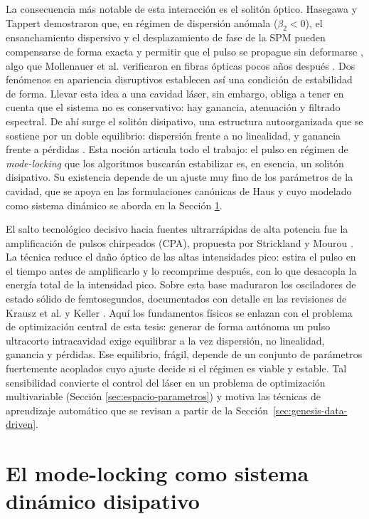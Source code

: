 La consecuencia más notable de esta interacción es el solitón óptico. Hasegawa y Tappert demostraron que, en régimen de dispersión anómala ($\beta_2 < 0$), el ensanchamiento dispersivo y el desplazamiento de fase de la SPM pueden compensarse de forma exacta y permitir que el pulso se propague sin deformarse \cite{HasegawaTappert1973}, algo que Mollenauer et al. verificaron en fibras ópticas pocos años después \cite{Mollenauer1980}. Dos fenómenos en apariencia disruptivos establecen así una condición de estabilidad de forma. Llevar esta idea a una cavidad láser, sin embargo, obliga a tener en cuenta que el sistema no es conservativo: hay ganancia, atenuación y filtrado espectral. De ahí surge el solitón disipativo, una estructura autoorganizada que se sostiene por un doble equilibrio: dispersión frente a no linealidad, y ganancia frente a pérdidas \cite{GreluAkhmediev2012}. Esta noción articula todo el trabajo: el pulso en régimen de \emph{mode-locking} que los algoritmos buscarán estabilizar es, en esencia, un solitón disipativo. Su existencia depende de un ajuste muy fino de los parámetros de la cavidad, que se apoya en las formulaciones canónicas de Haus \cite{Haus2000} y cuyo modelado como sistema dinámico se aborda en la Sección \ref{sec:mode-locking}.

El salto tecnológico decisivo hacia fuentes ultrarrápidas de alta potencia fue la amplificación de pulsos chirpeados (CPA), propuesta por Strickland y Mourou \cite{StricklandMourou1985}. La técnica reduce el daño óptico de las altas intensidades pico: estira el pulso en el tiempo antes de amplificarlo y lo recomprime después, con lo que desacopla la energía total de la intensidad pico. Sobre esta base maduraron los osciladores de estado sólido de femtosegundos, documentados con detalle en las revisiones de Krausz et al. \cite{Krausz1992} y Keller \cite{Keller2022, Keller2003}. Aquí los fundamentos físicos se enlazan con el problema de optimización central de esta tesis: generar de forma autónoma un pulso ultracorto intracavidad exige equilibrar a la vez dispersión, no linealidad, ganancia y pérdidas. Ese equilibrio, frágil, depende de un conjunto de parámetros fuertemente acoplados cuyo ajuste decide si el régimen es viable y estable. Tal sensibilidad convierte el control del láser en un problema de optimización multivariable (Sección \ref{sec:espacio-parametros}) y motiva las técnicas de aprendizaje automático que se revisan a partir de la Sección~\ref{sec:genesis-data-driven}.

\section{El mode-locking como sistema dinámico disipativo}
\label{sec:mode-locking}

